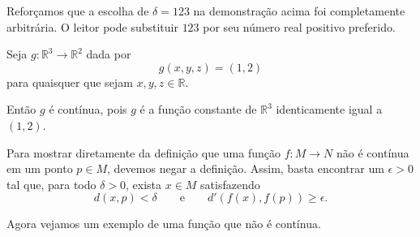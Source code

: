 Reforçamos que a escolha de $\delta = 123$ na demonstração acima foi completamente arbitrária.
O leitor pode substituir $123$ por seu número real positivo preferido.

\begin{example}
    Seja $g: \mathbb R^3\rightarrow \mathbb R^2$ dada por
    \[
        g(x, y, z) = (1, 2)
    \]
    para quaisquer que sejam $x, y, z \in \mathbb R$.

    Então $g$ é contínua, pois $g$ é a função constante de $\mathbb R^3$ identicamente igual a $(1, 2)$.
\end{example}


Para mostrar diretamente da definição que uma função $f:M\rightarrow N$ não é contínua em um ponto $p\in M$, devemos negar a definição.
Assim, basta encontrar um $\epsilon>0$ tal que, para todo $\delta>0$, exista $x\in M$ satisfazendo
\[
    d(x,p)<\delta
    \qquad\text{e}\qquad
    d'(f(x),f(p))\geq \epsilon.
\]

Agora vejamos um exemplo de uma função que não é contínua.

